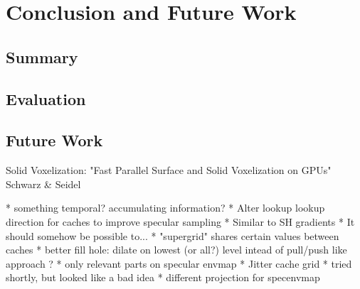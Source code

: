 \documentclass[thesis.tex]{subfiles}
\begin{document}
\chapter{Conclusion and Future Work}\label{chap:concl}

\section{Summary}


\section{Evaluation}


\section{Future Work}

Solid Voxelization: "Fast Parallel Surface and Solid Voxelization on GPUs"  Schwarz \& Seidel 


* something temporal? accumulating information?
* Alter lookup lookup direction for caches to improve specular sampling
  * Similar to SH gradients
  * It should somehow be possible to...
* "supergrid" shares certain values between caches
* better fill hole: dilate on lowest (or all?) level intead of pull/push like approach ?
* only relevant parts on specular envmap
* Jitter cache grid
  * tried shortly, but looked like a bad idea
* different projection for specenvmap

\subfilebib %
\end{document}
